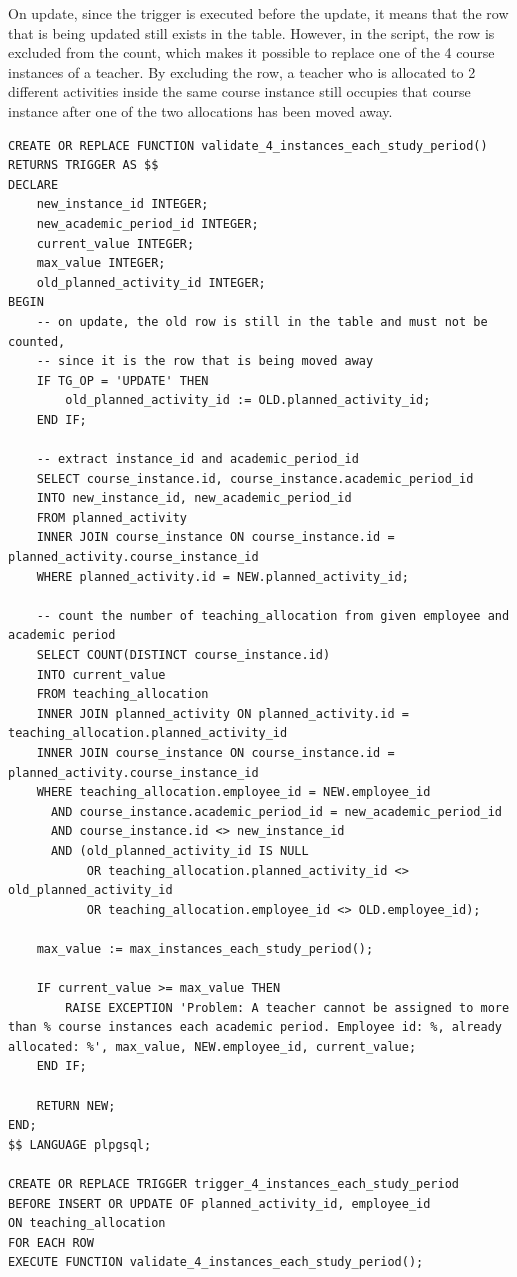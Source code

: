 \documentclass[a4paper]{scrartcl}
\renewcommand{\_}{\textunderscore\allowbreak}
\begin{document}
On update, since the trigger is executed before the update, it means that the row that is being updated still exists in the table. However, in the script, the row is excluded from the count, which makes it possible to replace one of the 4 course instances of a teacher. By excluding the row, a teacher who is allocated to 2 different activities inside the same course instance still occupies that course instance after one of the two allocations has been moved away.

\begin{lstlisting}[style=sql, caption={A trigger is used to maintain the maximum number of course instances per teacher and period (\texttt{trigger-4-instance-study-period.sql}).}, label={lst:trigger}]
CREATE OR REPLACE FUNCTION validate_4_instances_each_study_period()
RETURNS TRIGGER AS $$
DECLARE
    new_instance_id INTEGER;
    new_academic_period_id INTEGER;
    current_value INTEGER;
    max_value INTEGER;
    old_planned_activity_id INTEGER;
BEGIN
    -- on update, the old row is still in the table and must not be counted,
    -- since it is the row that is being moved away
    IF TG_OP = 'UPDATE' THEN
        old_planned_activity_id := OLD.planned_activity_id;
    END IF;

    -- extract instance_id and academic_period_id
    SELECT course_instance.id, course_instance.academic_period_id
    INTO new_instance_id, new_academic_period_id
    FROM planned_activity
    INNER JOIN course_instance ON course_instance.id = planned_activity.course_instance_id
    WHERE planned_activity.id = NEW.planned_activity_id;

    -- count the number of teaching_allocation from given employee and academic period
    SELECT COUNT(DISTINCT course_instance.id)
    INTO current_value
    FROM teaching_allocation
    INNER JOIN planned_activity ON planned_activity.id = teaching_allocation.planned_activity_id
    INNER JOIN course_instance ON course_instance.id = planned_activity.course_instance_id
    WHERE teaching_allocation.employee_id = NEW.employee_id
      AND course_instance.academic_period_id = new_academic_period_id
      AND course_instance.id <> new_instance_id
      AND (old_planned_activity_id IS NULL
           OR teaching_allocation.planned_activity_id <> old_planned_activity_id
           OR teaching_allocation.employee_id <> OLD.employee_id);

    max_value := max_instances_each_study_period();

    IF current_value >= max_value THEN
        RAISE EXCEPTION 'Problem: A teacher cannot be assigned to more than % course instances each academic period. Employee id: %, already allocated: %', max_value, NEW.employee_id, current_value;
    END IF;

    RETURN NEW;
END;
$$ LANGUAGE plpgsql;

CREATE OR REPLACE TRIGGER trigger_4_instances_each_study_period
BEFORE INSERT OR UPDATE OF planned_activity_id, employee_id
ON teaching_allocation
FOR EACH ROW
EXECUTE FUNCTION validate_4_instances_each_study_period();
\end{lstlisting}
\end{document}
